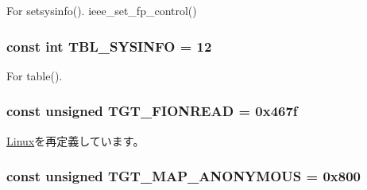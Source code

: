 For setsysinfo(). ieee\_\-set\_\-fp\_\-control() \hypertarget{classMipsLinux_a02a979126f2aa34bcdfdc6ab92207d3b}{
\subsubsection[{TBL\_\-SYSINFO}]{\setlength{\rightskip}{0pt plus 5cm}const int {\bf TBL\_\-SYSINFO} = 12}}
\label{classMipsLinux_a02a979126f2aa34bcdfdc6ab92207d3b}


For table(). \hypertarget{classMipsLinux_a1def346ff527c8efccfd52463f3b5dc1}{
\subsubsection[{TGT\_\-FIONREAD}]{\setlength{\rightskip}{0pt plus 5cm}const unsigned {\bf TGT\_\-FIONREAD} = 0x467f}}
\label{classMipsLinux_a1def346ff527c8efccfd52463f3b5dc1}


\hyperlink{classLinux_a1def346ff527c8efccfd52463f3b5dc1}{Linux}を再定義しています。\hypertarget{classMipsLinux_a0bbc267200567dd98250b99b6085a499}{
\subsubsection[{TGT\_\-MAP\_\-ANONYMOUS}]{\setlength{\rightskip}{0pt plus 5cm}const unsigned {\bf TGT\_\-MAP\_\-ANONYMOUS} = 0x800}}
\label{classMipsLinux_a0bbc267200567dd98250b99b6085a499}


